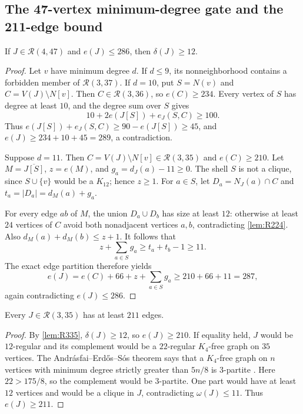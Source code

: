 \subsection{The 47-vertex minimum-degree gate and the 211-edge bound}

\begin{lemma}
\label{lem:gate47}
If $J\in\mathcal R(4,47)$ and $e(J)\leq286$, then $\delta(J)\geq12$.
\end{lemma}

\begin{proof}
Let $v$ have minimum degree $d$. If $d\leq9$, its nonneighborhood contains a forbidden member of $\mathcal R(3,37)$. If $d=10$, put $S=N(v)$ and $C=V(J)\setminus N[v]$. Then $C\in\mathcal R(3,36)$, so $e(C)\geq234$. Every vertex of $S$ has degree at least $10$, and the degree sum over $S$ gives
\[
10+2e(J[S])+e_J(S,C)\geq100.
\]
Thus $e(J[S])+e_J(S,C)\geq90-e(J[S])\geq45$, and $e(J)\geq234+10+45=289$, a contradiction.

Suppose $d=11$. Then $C=V(J)\setminus N[v]\in\mathcal R(3,35)$ and $e(C)\geq210$. Let $M=\overline{J[S]}$, $z=e(M)$, and $g_a=d_J(a)-11\geq0$. The shell $S$ is not a clique, since $S\cup\{v\}$ would be a $K_{12}$; hence $z\geq1$. For $a\in S$, let $D_a=N_J(a)\cap C$ and $t_a=|D_a|=d_M(a)+g_a$.

For every edge $ab$ of $M$, the union $D_a\cup D_b$ has size at least $12$: otherwise at least $24$ vertices of $C$ avoid both nonadjacent vertices $a,b$, contradicting \cref{lem:R224}. Also $d_M(a)+d_M(b)\leq z+1$. It follows that
\[
z+\sum_{a\in S}g_a
\geq t_a+t_b-1\geq11.
\]
The exact edge partition therefore yields
\[
e(J)=e(C)+66+z+\sum_{a\in S}g_a
\geq210+66+11=287,
\]
again contradicting $e(J)\leq286$.
\end{proof}

\begin{lemma}
\label{lem:core211}
Every $J\in\mathcal R(3,35)$ has at least $211$ edges.
\end{lemma}

\begin{proof}
By \cref{lem:R335}, $\delta(J)\geq12$, so $e(J)\geq210$. If equality held, $J$ would be $12$-regular and its complement would be a $22$-regular $K_4$-free graph on $35$ vertices. The Andrásfai--Erd\H{o}s--Sós theorem says that a $K_4$-free graph on $n$ vertices with minimum degree strictly greater than $5n/8$ is $3$-partite \cite{AndrasfaiErdosSos1974}. Here $22>175/8$, so the complement would be $3$-partite. One part would have at least $12$ vertices and would be a clique in $J$, contradicting $\omega(J)\leq11$. Thus $e(J)\geq211$.
\end{proof}

